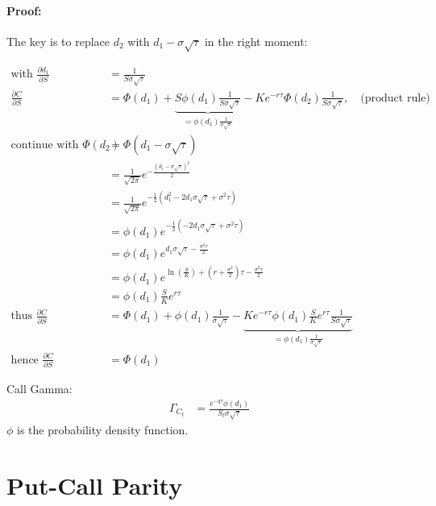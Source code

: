\documentclass[a4paper, DIV19,12pt]{scrartcl}
\newcommand{\parens}   [1]{         (   #1          )   } %
\newcommand{\bparens}  [1]{\left(       #1 \right)      } %
\begin{document}
\paragraph{Proof:} The key is to replace $d_2$ with $d_1 - \sigma\sqrt{\tau}$ in the right moment:

\begin{align}
\text{with }\frac{\partial d_1}{\partial S}  &= \frac{1}{S \sigma\sqrt{\tau}} \\
\frac{\partial C}{\partial S}  &= \Phi\bparens{d_1} + \underbrace{S \phi\bparens{d_1} \frac{1}{S\sigma\sqrt{\tau}}}_{=  \phi\bparens{d_1}\frac{1}{\sigma\sqrt{\tau}}} - Ke^{-r\tau}\Phi\bparens{d_2}\frac{1}{S\sigma\sqrt{\tau}}, \quad \text{(product rule)} \\
\text{continue with }\Phi\bparens{d_2} &= \Phi\bparens{d_1 - \sigma\sqrt{\tau}} \\
&= \frac{1}{\sqrt{2\pi}} e^{-\frac{\bparens{d_1 - \sigma\sqrt{\tau}}^2}{2}} \\
&= \frac{1}{\sqrt{2\pi}} e^{-\frac{1}{2}\bparens{d_1^2 - 2d_1\sigma\sqrt{\tau} + \sigma^2\tau}} \\
&= \phi\bparens{d_1} e^{-\frac{1}{2}\bparens{- 2d_1\sigma\sqrt{\tau} + \sigma^2\tau}} \\
&= \phi\bparens{d_1} e^{d_1\sigma\sqrt{\tau} - \frac{\sigma^2\tau}{2}} \\
&= \phi\bparens{d_1} e^{\ln\bparens{\frac{S}{K}} + \bparens{r + \frac{\sigma^2}{2}}\tau - \frac{\sigma^2\tau}{2}} \\
&= \phi\bparens{d_1} \frac{S}{K} e^{r\tau} \\
\text{thus } \frac{\partial C}{\partial S}  &= \Phi\bparens{d_1} + \phi\bparens{d_1} \frac{1}{\sigma\sqrt{\tau}} - 
\underbrace{Ke^{-r\tau}\phi\bparens{d_1} \frac{S}{K} e^{r\tau}\frac{1}{S\sigma\sqrt{\tau}}}_{=  \phi\bparens{d_1}\frac{1}{\sigma\sqrt{\tau}}} \\
\text{hence } \frac{\partial C}{\partial S}  &= \Phi\bparens{d_1}
\end{align}

Call Gamma:
\begin{align}
\Gamma_{C_t} &= \frac{e^{-q\tau} \phi\parens{d_1}}{S_t \sigma \sqrt{\tau}}
\end{align}
$\phi$ is the probability density function.

\section{Put-Call Parity}
\end{document}
